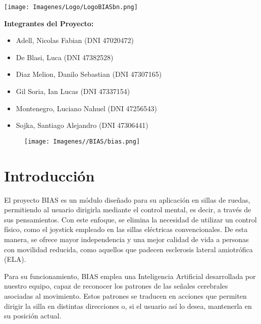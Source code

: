 \documentclass{article}
\begin{document}
\date{} 

\begin{center}
    \texttt{[image: Imagenes/Logo/LogoBIASbn.png]}\\ 
\end{center}

\title{}

\vspace{1cm} 

\textbf{Integrantes del Proyecto:} 

\begin{itemize}
    \item Adell, Nicolas Fabian (DNI 47020472)
    \item De Blasi, Luca (DNI 47382528)
    \item Diaz Melion, Danilo Sebastian (DNI 47307165)
    \item Gil Soria, Ian Lucas (DNI 47337154)
    \item Montenegro, Luciano Nahuel (DNI 47256543)
    \item Sojka, Santiago Alejandro (DNI 47306441)
\end{itemize}

\begin{figure}[H]
    \centering
    \texttt{[image: Imagenes//BIAS/bias.png]}
\end{figure}

\tableofcontents 

\newpage 

\section{Introducción}
El proyecto BIAS es un módulo diseñado para su aplicación en sillas de ruedas, permitiendo al usuario dirigirla mediante el control mental, es decir, a través de sus pensamientos. Con este enfoque, se elimina la necesidad de utilizar un control físico, como el joystick empleado en las sillas eléctricas convencionales. De esta manera, se ofrece mayor independencia y una mejor calidad de vida a personas con movilidad reducida, como aquellos que padecen esclerosis lateral amiotrófica (ELA).


Para su funcionamiento, BIAS emplea una Inteligencia Artificial desarrollada por nuestro equipo, capaz de reconocer los patrones de las señales cerebrales asociadas al movimiento. Estos patrones se traducen en acciones que permiten dirigir la silla en distintas direcciones o, si el usuario así lo desea, mantenerla en su posición actual.
\end{document}
